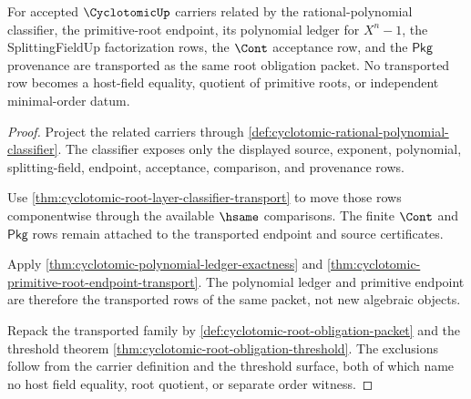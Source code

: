 \begin{theorem}
\label{thm:cyclotomic-primitive-root-ledger-transport}
For accepted $\CyclotomicUp$ carriers related by the rational-polynomial
classifier, the primitive-root endpoint, its polynomial ledger for $X^n-1$, the
SplittingFieldUp factorization rows, the $\Cont$ acceptance row, and the
$\mathsf{Pkg}$ provenance are transported as the same root obligation packet.
No transported row becomes a host-field equality, quotient of primitive roots,
or independent minimal-order datum.
\end{theorem}
\begin{proof}
Project the related carriers through
\autoref{def:cyclotomic-rational-polynomial-classifier}. The classifier exposes
only the displayed source, exponent, polynomial, splitting-field, endpoint,
acceptance, comparison, and provenance rows.

Use \autoref{thm:cyclotomic-root-layer-classifier-transport} to move those rows
componentwise through the available $\hsame$ comparisons. The finite $\Cont$
and $\mathsf{Pkg}$ rows remain attached to the transported endpoint and source
certificates.

Apply \autoref{thm:cyclotomic-polynomial-ledger-exactness} and
\autoref{thm:cyclotomic-primitive-root-endpoint-transport}. The polynomial
ledger and primitive endpoint are therefore the transported rows of the same
packet, not new algebraic objects.

Repack the transported family by
\autoref{def:cyclotomic-root-obligation-packet} and the threshold theorem
\autoref{thm:cyclotomic-root-obligation-threshold}. The exclusions follow from
the carrier definition and the threshold surface, both of which name no host
field equality, root quotient, or separate order witness.
\end{proof}

